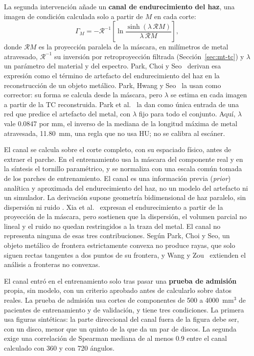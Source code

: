 La segunda intervención añade un \textbf{canal de endurecimiento del haz}, una imagen de condición calculada solo a partir de $M$ en cada corte:
\begin{equation}
\Gamma_M = -\mathcal{R}^{-1}\left[\ln \frac{\sinh(\lambda\,\mathcal{R}M)}{\lambda\,\mathcal{R}M}\right],
\label{eq:canal}
\end{equation}
donde $\mathcal{R}M$ es la proyección paralela de la máscara, en milímetros de metal atravesado, $\mathcal{R}^{-1}$ su inversión por retroproyección filtrada (Sección~\ref{sec:mt-tc}) y $\lambda$ un parámetro del material y del espectro. Park, Choi y Seo~\cite{park2017characterization} derivan esa expresión como el término de artefacto del endurecimiento del haz en la reconstrucción de un objeto metálico. Park, Hwang y Seo~\cite{park2016MAR} la usan como corrector: su forma se calcula desde la máscara, pero $\lambda$ se estima en cada imagen a partir de la TC reconstruida. Park et al.~\cite{hyung2017ml} la dan como única entrada de una red que predice el artefacto del metal, con $\lambda$ fijo para todo el conjunto. Aquí, $\lambda$ vale 0.0847 por mm, el inverso de la mediana de la longitud máxima de metal atravesada, 11.80~mm, una regla que no usa HU; no se calibra al escáner.

El canal se calcula sobre el corte completo, con su espaciado físico, antes de extraer el parche. En el entrenamiento usa la máscara del componente real y en la síntesis el tornillo paramétrico, y se normaliza con una escala común tomada de los parches de entrenamiento. El canal es una información previa (\emph{prior}) analítica y aproximada del endurecimiento del haz, no un modelo del artefacto ni un simulador. La derivación supone geometría bidimensional de haz paralelo, sin dispersión ni ruido \cite{park2017characterization}. Xia et al.~\cite{xia2024pndnet} expresan el endurecimiento a partir de la proyección de la máscara, pero sostienen que la dispersión, el volumen parcial no lineal y el ruido no quedan restringidos a la traza del metal. El canal no representa ninguna de esas tres contribuciones. Según Park, Choi y Seo, un objeto metálico de frontera estrictamente convexa no produce rayas, que solo siguen rectas tangentes a dos puntos de su frontera, y Wang y Zou~\cite{wang2021streak} extienden el análisis a fronteras no convexas.

El canal entró en el entrenamiento solo tras pasar una \textbf{prueba de admisión} propia, sin modelo, con un criterio aprobado antes de calcularlo sobre datos reales. La prueba de admisión usa cortes de componentes de 500 a 4000~mm$^3$ de pacientes de entrenamiento y de validación, y tiene tres condiciones. La primera usa figuras sintéticas: la parte direccional del canal fuera de la figura debe ser, con un disco, menor que un quinto de la que da un par de discos. La segunda exige una correlación de Spearman mediana de al menos 0.9 entre el canal calculado con 360 y con 720 ángulos.

